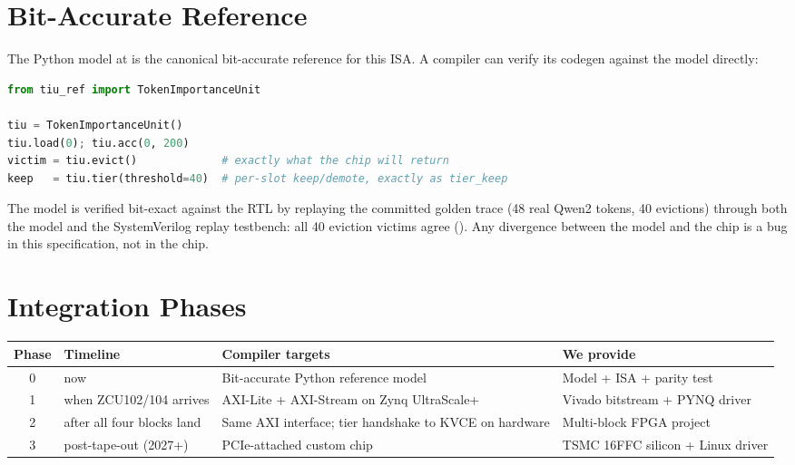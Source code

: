\documentclass[11pt]{article}
\begin{document}
\section{Bit-Accurate Reference}
\label{sec:ref}

The Python model at  is the canonical
bit-accurate reference for this ISA. A compiler can verify its codegen against
the model directly:

\begin{lstlisting}[language=Python]
from tiu_ref import TokenImportanceUnit

tiu = TokenImportanceUnit()
tiu.load(0); tiu.acc(0, 200)
victim = tiu.evict()             # exactly what the chip will return
keep   = tiu.tier(threshold=40)  # per-slot keep/demote, exactly as tier_keep
\end{lstlisting}

\noindent The model is verified bit-exact against the RTL by replaying the
committed golden trace  (48 real Qwen2
tokens, 40 evictions) through both the model and the SystemVerilog replay
testbench: all 40 eviction victims agree
(). Any divergence between the model and
the chip is a bug in this specification, not in the chip.

\section{Integration Phases}
\label{sec:phases}

\begin{table}[ht]
\centering
\small
\renewcommand{\arraystretch}{1.2}
\begin{tabular}{@{}c p{3.0cm} p{4.0cm} p{5.0cm}@{}}
\toprule
Phase & Timeline & Compiler targets & We provide \\
\midrule
0 & now & Bit-accurate Python reference model & Model + ISA + parity test \\
1 & when ZCU102/104 arrives & AXI-Lite + AXI-Stream on Zynq UltraScale+ & Vivado bitstream + PYNQ driver \\
2 & after all four blocks land & Same AXI interface; tier handshake to KVCE on hardware & Multi-block FPGA project \\
3 & post-tape-out (2027+) & PCIe-attached custom chip & TSMC 16FFC silicon + Linux driver \\
\bottomrule
\end{tabular}
\end{table}
\end{document}
